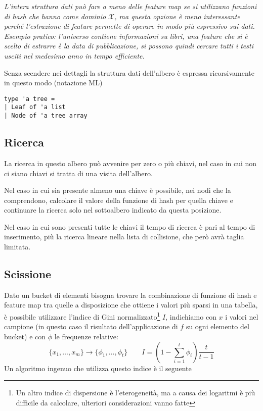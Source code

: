 \documentclass[a4paper]{article}
\begin{document}
\textit{L'intera struttura dati può fare a meno delle feature map se si utilizzano funzioni di hash che hanno come dominio $\mathcal{X}$, ma questa opzione è meno interessante perché l'estrazione di feature permette di operare in modo più espressivo sui dati. Esempio pratico: l'universo contiene informazioni su libri, una feature che si è scelto di estrarre è la data di pubblicazione, si possono quindi cercare tutti i testi usciti nel medesimo anno in tempo efficiente.}

Senza scendere nei dettagli la struttura dati dell'albero è espressa ricorsivamente in questo modo (notazione ML)
\begin{verbatim}
type 'a tree =
| Leaf of 'a list
| Node of 'a tree array
\end{verbatim}

\subsection*{Ricerca}

La ricerca in questo albero può avvenire per zero o più chiavi, nel caso in cui non ci siano chiavi si tratta di una visita dell'albero.

Nel caso in cui sia presente almeno una chiave è possibile, nei nodi che la comprendono, calcolare il valore della funzione di hash per quella chiave e continuare la ricerca solo nel sottoalbero indicato da questa posizione.

Nel caso in cui sono presenti tutte le chiavi il tempo di ricerca è pari al tempo di inserimento, più la ricerca lineare nella lista di collisione, che però avrà taglia limitata.

\subsection*{Scissione}
Dato un bucket di elementi bisogna trovare la combinazione di funzione di hash e feature map tra quelle a disposizione che ottiene i valori più sparsi in una tabella, è possibile utilizzare l'indice di Gini normalizzato\footnote{Un altro indice di dispersione è l'eterogeneità, ma a causa dei logaritmi è più difficile da calcolare, ulteriori considerazioni vanno fatte} $I$, indichiamo con $x$ i valori nel campione (in questo caso il risultato dell'applicazione di $f$ su ogni elemento del bucket) e con $\phi$ le frequenze relative:
$$ \{ x_1, \ldots, x_m \} \rightarrow \{ \phi_1, \ldots, \phi_t \} \qquad I = \left( 1 - \sum_{i=1}^{t}\phi_i \right) \frac{t}{t - 1} $$
Un algoritmo ingenuo che utilizza questo indice è il seguente
\end{document}
